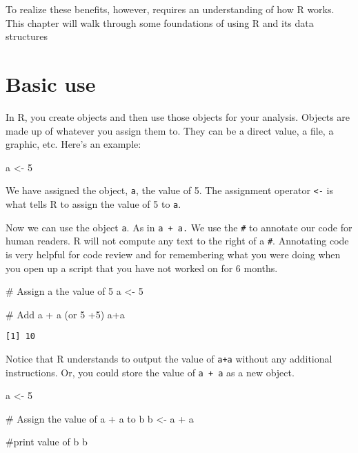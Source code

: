 \documentclass[
  letterpaper,
  DIV=11,
  numbers=noendperiod]{scrreprt}
\newenvironment{Shaded}{\begin{snugshade}}{\end{snugshade}}
\newcommand{\CommentTok}[1]{\textcolor[rgb]{0.37,0.37,0.37}{#1}}
\newcommand{\DecValTok}[1]{\textcolor[rgb]{0.68,0.00,0.00}{#1}}
\newcommand{\NormalTok}[1]{\textcolor[rgb]{0.00,0.23,0.31}{#1}}
\newcommand{\OtherTok}[1]{\textcolor[rgb]{0.00,0.23,0.31}{#1}}
\newcommand{\SpecialCharTok}[1]{\textcolor[rgb]{0.37,0.37,0.37}{#1}}
\begin{document}
To realize these benefits, however, requires an understanding of how R
works. This chapter will walk through some foundations of using R and
its data structures

\section{Basic use}\label{basic-use}

In R, you create objects and then use those objects for your analysis.
Objects are made up of whatever you assign them to. They can be a direct
value, a file, a graphic, etc. Here's an example:

\begin{Shaded}
\begin{Highlighting}[]
\NormalTok{a }\OtherTok{\textless{}{-}} \DecValTok{5}
\end{Highlighting}
\end{Shaded}

We have assigned the object, \texttt{a}, the value of 5. The assignment
operator \texttt{\textless{}-} is what tells R to assign the value of 5
to \texttt{a}.

Now we can use the object \texttt{a}. As in \texttt{a\ +\ a.} We use the
\texttt{\#} to annotate our code for human readers. R will not compute
any text to the right of a \texttt{\#}. Annotating code is very helpful
for code review and for remembering what you were doing when you open up
a script that you have not worked on for 6 months.

\begin{Shaded}
\begin{Highlighting}[]
\CommentTok{\# Assign a the value of 5}
\NormalTok{a }\OtherTok{\textless{}{-}} \DecValTok{5}

\CommentTok{\# Add a + a (or 5 +5)}
\NormalTok{a}\SpecialCharTok{+}\NormalTok{a}
\end{Highlighting}
\end{Shaded}

\begin{verbatim}
[1] 10
\end{verbatim}

Notice that R understands to output the value of \texttt{a+a} without
any additional instructions. Or, you could store the value of
\texttt{a\ +\ a} as a new object.

\begin{Shaded}
\begin{Highlighting}[]
\NormalTok{a }\OtherTok{\textless{}{-}} \DecValTok{5}

\CommentTok{\# Assign the value of a + a to b}
\NormalTok{b }\OtherTok{\textless{}{-}}\NormalTok{ a }\SpecialCharTok{+}\NormalTok{ a}

\CommentTok{\#print value of b}
\NormalTok{b}
\end{Highlighting}
\end{Shaded}
\end{document}
